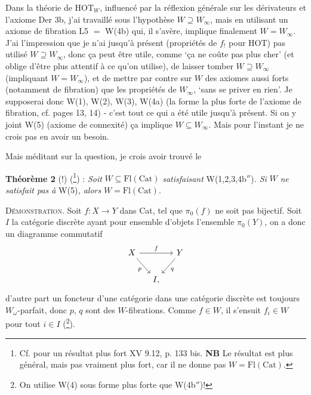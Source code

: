 \documentclass[11pt]{article}
\newcommand{\msp}[1]{\marginpar{\footnotesize [#1]}}
\newcommand{\Cat}{\mathrm{Cat}}
\newcommand{\Fl}{\mathrm{Fl}}
\begin{document}
\msp{page 20}Dans la théorie de $\mathrm{HOT}_W$, influencé par la réflexion générale sur les dérivateurs et l'axiome Der 3b, j'ai travaillé sous l'hypothèse $W \supseteq W_\infty$, mais en utilisant un axiome de fibration L5 $=$ W(4b) qui, il s'avère, implique finalement $W = W_\infty$. J'ai l'impression que je n'ai jusqu'à présent (propriétés de $f_!$ pour HOT) pas utilisé $W \supseteq W_\infty$, donc ça peut être utile, comme `ça ne coûte pas plus cher' (et oblige d'être plus attentif à ce qu'on utilise), de laisser tomber $W \supseteq W_\infty$ (impliquant $W = W_\infty$), et de mettre par contre sur $W$ des axiomes aussi forts (notamment de fibration) que les propriétés de $W_\infty$, `sans se priver en rien'. Je supposerai donc W(1), W(2), W(3), W(4a) (la forme la plus forte de l'axiome de fibration, cf. pages 13, 14) - c'est tout ce qui a été utile jusqu'à présent. Si on y joint W(5) (axiome de connexité) ça implique $W \subseteq W_\infty$. Mais pour l'instant je ne crois pas en avoir un besoin.

Mais méditant sur la question, je crois avoir trouvé le

\textbf{Théorème 2} (!) (\footnote[41]{Cf. pour un résultat plus fort XV 9.12, p. 133 bis. \textbf{NB} Le résultat est plus général, mais pas vraiment plus fort, car il ne donne pas $W = \Fl(\Cat)$.}) : \textit{Soit} $W \subseteq \Fl(\Cat)$ \textit{satisfaisant} W(1,2,3,4b$''$)\textit{. Si} $W$ \textit{ne satisfait pas à} W(5)\textit{, alors} $W = \Fl(\Cat)$.

\textsc{Démonstration}. Soit $f : X \longrightarrow Y$ dans Cat, tel que $\pi_0(f)$ ne soit pas bijectif. Soit $I$ la catégorie discrète ayant pour ensemble d'objets l'ensemble $\pi_0(Y)$, on a donc un diagramme commutatif
\[
\begin{tikzcd}[column sep=small]
X \arrow[rr, "f"] \arrow[dr, "p"'] & & Y \arrow[dl, "q"] \\
& I, &
\end{tikzcd}
\]
d'autre part un foncteur d'une catégorie dans une catégorie discrète est toujours $W_\omega$-parfait, donc $p$, $q$ sont des $W$-fibrations. Comme\msp{page 21} $f \in W$, il s'ensuit $f_i \in W$ pour tout $i \in I$ (\footnote[42]{On utilise W(4) sous forme plus forte que W(4b$''$)!}).
\end{document}
